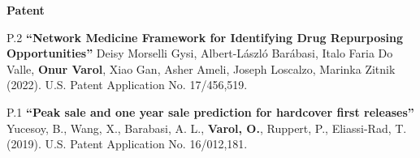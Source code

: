 \documentclass[10pt]{article}
\newenvironment{innerlist}[1][\enskip\textbullet]%
        {\begin{compactitem}[#1]}{\end{compactitem}}
\begin{document}
\vspace{3mm}

\textbf{Patent}
\begin{innerlist}
\item[P.2] \textbf{``Network Medicine Framework for Identifying Drug Repurposing Opportunities''} Deisy Morselli Gysi, Albert-László Barábasi, Italo Faria Do Valle, \textbf{Onur Varol}, Xiao Gan, Asher Ameli, Joseph Loscalzo, Marinka Zitnik  (2022). U.S. Patent Application No. 17/456,519.

\item[P.1] \textbf{``Peak sale and one year sale prediction for hardcover first releases''} Yucesoy, B., Wang, X., Barabasi, A. L., \textbf{Varol, O.}, Ruppert, P., Eliassi-Rad, T.  (2019). U.S. Patent Application No. 16/012,181.
\end{innerlist}
\end{document}
